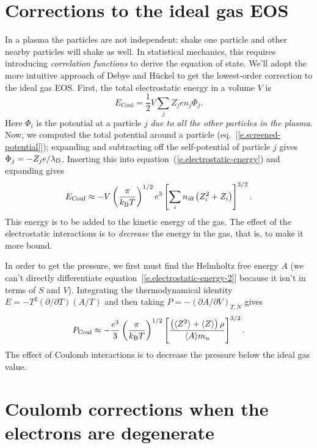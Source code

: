 \section{Corrections to the ideal gas EOS}\label{s.plasma-corrections}

In a plasma the particles are not independent: shake one particle and other nearby particles will shake as well. In statistical mechanics, this requires introducing \emph{correlation functions} to derive the equation of state.  We'll adopt the more intuitive approach of Debye and H\"uckel to get the lowest-order correction to the ideal gas EOS.  First, the total electrostatic energy in a volume $V$ is
\begin{equation}\label{e.electrostatic-energy}
E_{\mathrm{Coul}} = \frac{1}{2}V\sum_{j}Z_{j}e n_{j}\Phi_{j}.
\end{equation}
Here $\Phi_{i}$ is the potential at a particle $j$ \emph{due to all the other particles in the plasma.}  Now, we computed the total potential around a particle (eq.~[\ref{e.screened-potential}]); expanding and subtracting off the self-potential of particle $j$ gives $\Phi_{j} = -Z_{j}e/\lambda_{\mathrm{D}}$.  Inserting this into equation~(\ref{e.electrostatic-energy}) and expanding gives
\begin{equation}\label{e.electrostatic-energy-2}
E_{\mathrm{Coul}} \approx - V\left(\frac{\pi}{k_\mathrm{B} T}\right)^{1/2} e^{3} \left[\sum_{i}n_{i0} \left(Z_{i}^{2} + Z_{i}\right)\right]^{3/2}.
\end{equation}
This energy is to be added to the kinetic energy of the gas.  The effect of the electrostatic interactions is to \emph{decrease} the energy in the gas, that is, to make it more bound.

In order to get the pressure, we first must find the Helmholtz free energy $A$ (we can't directly differentiate equation~[\ref{e.electrostatic-energy-2}] because it isn't in terms of $S$ and $V$). Integrating the thermodynamical identity $E = -T^{2}(\partial/\partial T)(A/T)$ and then taking $P = -(\partial A/\partial V)_{T,N}$ gives
\begin{equation}\label{e.pressure-correction}
 P_{\mathrm{Coul}} \approx -\frac{e^{3}}{3}\left(\frac{\pi}{k_\mathrm{B} T}\right)^{1/2}\left[\frac{\left(\langle Z^{2}\rangle+\langle Z\rangle \right)\rho}{\langle A\rangle m_\mathrm{u}}\right]^{3/2}.
\end{equation}
The effect of Coulomb interactions is to decrease the pressure below the ideal gas value.

\section[Strongly Coupled Plasmas]{Coulomb corrections when the electrons are degenerate}\label{s.degenerate-coulomb}

